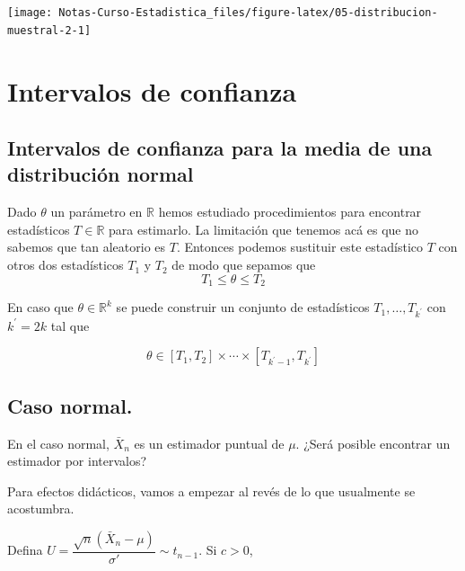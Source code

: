 \documentclass[
  12pt,
]{book}
\begin{document}
\begin{center}\texttt{[image: Notas-Curso-Estadistica\_files/figure-latex/05-distribucion-muestral-2-1]} \end{center}

\hypertarget{intervalos-de-confianza}{%
\chapter{Intervalos de confianza}\label{intervalos-de-confianza}}

\hypertarget{intervalos-de-confianza-para-la-media-de-una-distribuciuxf3n-normal}{%
\section{Intervalos de confianza para la media de una distribución normal}\label{intervalos-de-confianza-para-la-media-de-una-distribuciuxf3n-normal}}

Dado \(\theta\) un parámetro en \(\mathbb{R}\) hemos estudiado procedimientos para
encontrar estadísticos \(T\in \mathbb R\) para estimarlo. La limitación que
tenemos acá es que no sabemos que tan aleatorio es \(T\). Entonces podemos
sustituir este estadístico \(T\) con otros dos estadísticos \(T_1\) y \(T_2\)
de modo que sepamos que
\begin{equation*}
T_1 \leq \theta \leq T_2
\end{equation*}

En caso que \(\theta \in \mathbb{R} ^{k}\) se puede construir un conjunto de
estadísticos \(T_1, \ldots, T_{k^\prime}\) con \(k^\prime = 2k\) tal que

\begin{equation*}
\theta \in [T_1, T_2] \times \cdots \times [T_{k^\prime-1}, T_{k^\prime}]
\end{equation*}

\hypertarget{caso-normal.}{%
\section{Caso normal.}\label{caso-normal.}}

En el caso normal, \(\bar X_n\) es un estimador puntual de \(\mu\). ¿Será posible
encontrar un estimador por intervalos?

Para efectos didácticos, vamos a empezar al revés de lo que usualmente se
acostumbra.

Defina \(U = \dfrac{\sqrt{n}(\bar X_n-\mu)}{\sigma'} \sim t_{n-1}\). Si \(c>0\),
\end{document}
